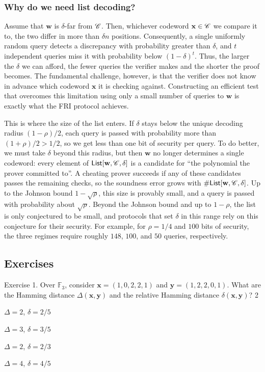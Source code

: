 \documentclass[../../book]{subfiles}
\begin{document}
\subsubsection{Why do we need list decoding?}
Assume that $\mathbf{w}$ is $\delta$-far from $\mathscr{C}$.
Then, whichever codeword $\mathbf{x} \in \mathscr{C}$ we compare it to, the two differ in more than $\delta n$ positions.
Consequently, a single uniformly random query detects a discrepancy with probability greater than $\delta$, and $t$ independent queries miss it with probability below $(1-\delta)^t$.
Thus, the larger the $\delta$ we can afford, the fewer queries the verifier makes and the shorter the proof becomes.
The fundamental challenge, however, is that the verifier does not know in advance which codeword $\mathbf{x}$ it is checking against.
Constructing an efficient test that overcomes this limitation using only a small number of queries to $\mathbf{w}$ is exactly what the FRI protocol achieves.

This is where the size of the list enters.
If $\delta$ stays below the unique decoding radius $(1-\rho)/2$, each query is passed with probability more than $(1+\rho)/2 > 1/2$, so we get less than one bit of security per query.
To do better, we must take $\delta$ beyond this radius, but then $\mathbf{w}$ no longer determines a single codeword: every element of $\mathsf{List}[\mathbf{w}, \mathscr{C}, \delta]$ is a candidate for ``the polynomial the prover committed to''.
A cheating prover succeeds if any of these candidates passes the remaining checks, so the soundness error grows with $\#\mathsf{List}[\mathbf{w}, \mathscr{C}, \delta]$.
Up to the Johnson bound $1 - \sqrt{\rho}$, this size is provably small, and a query is passed with probability about $\sqrt{\rho}$.
Beyond the Johnson bound and up to $1 - \rho$, the list is only conjectured to be small, and protocols that set $\delta$ in this range rely on this conjecture for their security.
For example, for $\rho = 1/4$ and $100$ bits of security, the three regimes require roughly $148$, $100$, and $50$ queries, respectively.

\subsection{Exercises}\label{section:linear-codes-exercises}

\begin{xexercise}
  {Exercise 1.}
  {Over $\mathbb{F}_3$, consider $\mathbf{x} = (1,0,2,2,1)$ and $\mathbf{y} = (1,2,2,0,1)$. What are the
  Hamming distance $\Delta(\mathbf{x},\mathbf{y})$ and the relative Hamming distance $\delta(\mathbf{x},\mathbf{y})$?}
  {2}
  {
    \item $\Delta = 2$, $\delta = 2/5$
    \item $\Delta = 3$, $\delta = 3/5$
    \item $\Delta = 2$, $\delta = 2/3$
    \item $\Delta = 4$, $\delta = 4/5$
  }
\end{xexercise}
\end{document}
